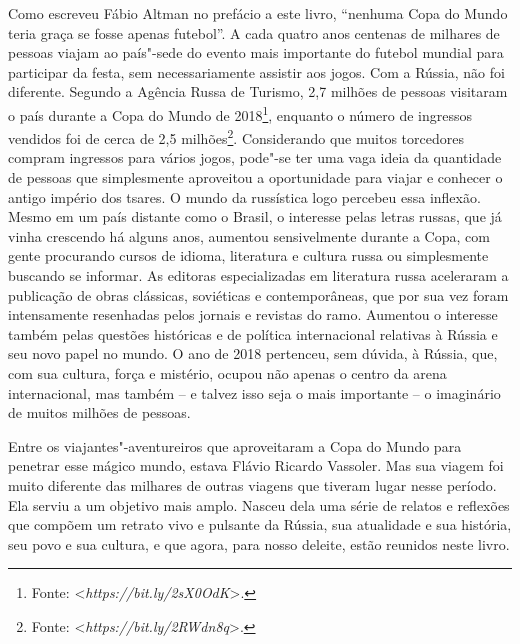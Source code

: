 Como escreveu Fábio Altman no prefácio a este livro, ``nenhuma Copa do
Mundo teria graça se fosse apenas futebol''. A cada quatro anos centenas
de milhares de pessoas viajam ao país"-sede do evento mais importante do
futebol mundial para participar da festa, sem necessariamente assistir
aos jogos. Com a Rússia, não foi diferente. Segundo a Agência Russa de
Turismo, 2,7 milhões de pessoas visitaram o país durante a Copa do Mundo
de 2018\footnote{Fonte: \textless{}\emph{https://bit.ly/2sX0OdK}\textgreater{}.},
enquanto o número de ingressos vendidos foi de cerca de 2,5
milhões\footnote{Fonte: \textless{}\emph{https://bit.ly/2RWdn8q}\textgreater{}.}.
Considerando que muitos torcedores compram ingressos para vários jogos,
pode"-se ter uma vaga ideia da quantidade de pessoas que simplesmente
aproveitou a oportunidade para viajar e conhecer o antigo império dos
tsares. O mundo da russística logo percebeu essa inflexão. Mesmo em um
país distante como o Brasil, o interesse pelas letras russas, que já
vinha crescendo há alguns anos, aumentou sensivelmente durante a Copa,
com gente procurando cursos de idioma, literatura e cultura russa ou
simplesmente buscando se informar. As editoras especializadas em
literatura russa aceleraram a publicação de obras clássicas, soviéticas
e contemporâneas, que por sua vez foram intensamente resenhadas pelos
jornais e revistas do ramo. Aumentou o interesse também pelas questões
históricas e de política internacional relativas à Rússia e seu novo
papel no mundo. O ano de 2018 pertenceu, sem dúvida, à Rússia, que, com
sua cultura, força e mistério, ocupou não apenas o centro da arena
internacional, mas também -- e talvez isso seja o mais importante -- o
imaginário de muitos milhões de pessoas.

Entre os viajantes"-aventureiros que aproveitaram a Copa do Mundo para
penetrar esse mágico mundo, estava Flávio Ricardo Vassoler. Mas sua
viagem foi muito diferente das milhares de outras viagens que tiveram
lugar nesse período. Ela serviu a um objetivo mais amplo. Nasceu dela
uma série de relatos e reflexões que compõem um retrato vivo e pulsante
da Rússia, sua atualidade e sua história, seu povo e sua cultura, e que
agora, para nosso deleite, estão reunidos neste livro.

